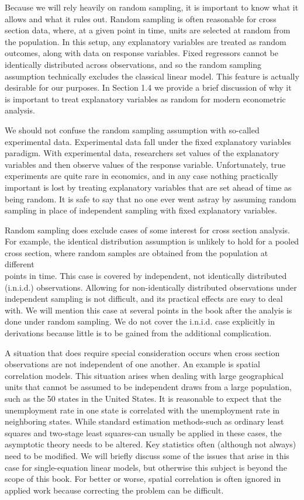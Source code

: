 \documentclass[10pt]{article}
\begin{document}
Because we will rely heavily on random sampling, it is important to know what it allows and what it rules out. Random sampling is often reasonable for cross section data, where, at a given point in time, units are selected at random from the population. In this setup, any explanatory variables are treated as random outcomes, along with data on response variables. Fixed regressors cannot be identically distributed across observations, and so the random sampling assumption technically excludes the classical linear model. This feature is actually desirable for our purposes. In Section 1.4 we provide a brief discussion of why it is important to treat explanatory variables as random for modern econometric analysis.

We should not confuse the random sampling assumption with so-called experimental data. Experimental data fall under the fixed explanatory variables paradigm. With experimental data, researchers set values of the explanatory variables and then observe values of the response variable. Unfortunately, true experiments are quite rare in economics, and in any case nothing practically important is lost by treating explanatory variables that are set ahead of time as being random. It is safe to say that no one ever went astray by assuming random sampling in place of independent sampling with fixed explanatory variables.

Random sampling does exclude cases of some interest for cross section analysis. For example, the identical distribution assumption is unlikely to hold for a pooled cross section, where random samples are obtained from the population at different\\
points in time. This case is covered by independent, not identically distributed (i.n.i.d.) observations. Allowing for non-identically distributed observations under independent sampling is not difficult, and its practical effects are easy to deal with. We will mention this case at several points in the book after the analyis is done under random sampling. We do not cover the i.n.i.d. case explicitly in derivations because little is to be gained from the additional complication.

A situation that does require special consideration occurs when cross section observations are not independent of one another. An example is spatial correlation models. This situation arises when dealing with large geographical units that cannot be assumed to be independent draws from a large population, such as the 50 states in the United States. It is reasonable to expect that the unemployment rate in one state is correlated with the unemployment rate in neighboring states. While standard estimation methods-such as ordinary least squares and two-stage least squares-can usually be applied in these cases, the asymptotic theory needs to be altered. Key statistics often (although not always) need to be modified. We will briefly discuss some of the issues that arise in this case for single-equation linear models, but otherwise this subject is beyond the scope of this book. For better or worse, spatial correlation is often ignored in applied work because correcting the problem can be difficult.
\end{document}

